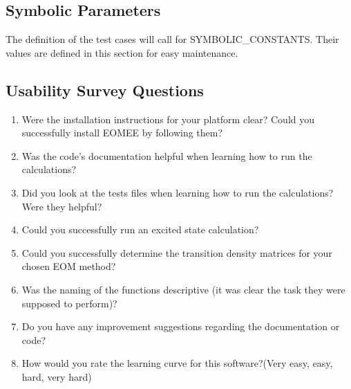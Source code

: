 \documentclass[12pt, titlepage]{article}
\begin{document}
\subsection{Symbolic Parameters}

The definition of the test cases will call for SYMBOLIC\_CONSTANTS.
Their values are defined in this section for easy maintenance.

\subsection{Usability Survey Questions}

\begin{enumerate}
	\item Were the installation instructions for your platform clear? Could you 
	successfully install EOMEE by following them?
	\item Was the code's documentation helpful when learning how to run the 
	calculations?
	\item Did you look at the tests files when learning how to run the 
	calculations? Were they helpful?
	\item Could you successfully run an excited state calculation?
	\item Could you successfully determine the transition density matrices for 
	your chosen EOM method?
	\item Was the naming of the functions descriptive (it was clear the 
	task they were supposed to perform)?
	\item Do you have any improvement suggestions regarding the documentation 
	or code?
	\item How would you rate the learning curve for this software?(Very easy, 
	easy, hard, very hard)
\end{enumerate}
\end{document}
